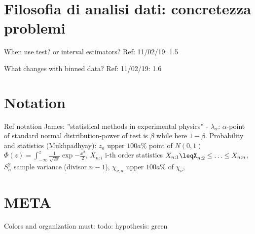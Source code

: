 \section{Filosofia di analisi dati: concretezza problemi}

\begin{frame}{When use test? or interval estimators?}\frameintoc
Ref: 11/02/19: 1.5
\end{frame}

\begin{frame}{What changes with binned data?}
Ref: 11/02/19: 1.6
\end{frame}

\section{Notation}

\begin{frame}{Ref notation}
 James: ''statistical methods in experimental physics'' - $\lambda_{\alpha}$: $\alpha$-point of standard normal distribution-power of test is $\beta$ while here $1-\beta$.
Probability and statistics (Mukhpadhyay): $z_a$ upper $100a\%$ point of $N(0,1)$ $\Phi(z)=\int_{-\infty}^z\frac{1}{\sqrt{2\pi}}\exp{-\frac{x^2}{2}}$, $X_{n:i}$ i-th order statistics $X_{n:1}\leqX_{n:2}\leq\ldots\leq X_{n:n}$, $S_n^2$ sample variance (divisor $n-1$), $\chi_{\nu,a}$ upper $100a\%$ of $\chi_{\nu}$, 
\end{frame}

\section{META}

\begin{frame}{Colors and organization}
must:
todo:
hypothesis: green
\end{frame}